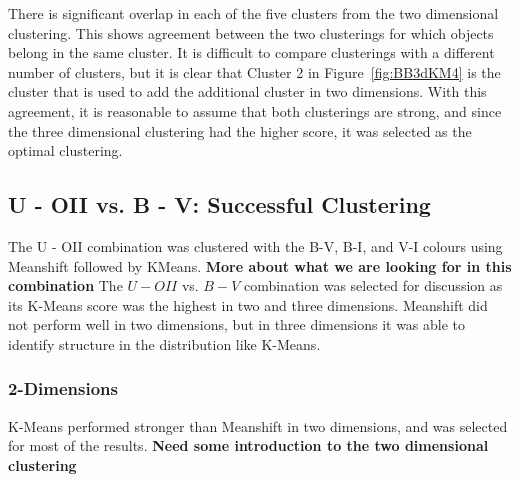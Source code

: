 There is significant overlap in each of the five clusters from the two dimensional clustering.
This shows agreement between the two clusterings for which objects belong in the same cluster. 
It is difficult to compare clusterings with a different number of clusters, but it is clear that Cluster 2 in Figure~\ref{fig:BB3dKM4} is the cluster that is used to add the additional cluster in two dimensions.
With this agreement, it is reasonable to assume that both clusterings are strong, and since the three dimensional clustering had the higher score, it was selected as the optimal clustering.

\subsection{U - OII vs. B - V: Successful Clustering}
The U - OII combination was clustered with the B-V, B-I, and V-I colours using Meanshift followed by KMeans. \textbf{More about what we are looking for in this combination}
The $U - OII$ vs. $B - V$ combination was selected for discussion as its K-Means score was the highest in two and three dimensions.
Meanshift did not perform well in two dimensions, but in three dimensions it was able to identify structure in the distribution like K-Means. 

\subsubsection{2-Dimensions}
K-Means performed stronger than Meanshift in two dimensions, and was selected for most of the results. \textbf{Need some introduction to the two dimensional clustering}

